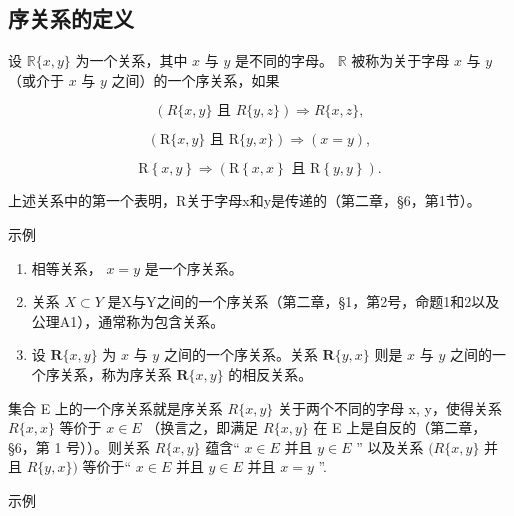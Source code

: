 \subsection{序关系的定义}

设 \(\mathbb{R}\{x, y\}\) 为一个关系，其中 \(x\) 与 \(y\) 是不同的字母。 \(\mathbb{R}\) 被称为关于字母 \(x\) 与 \(y\) （或介于 \(x\) 与 \(y\) 之间）的一个序关系，如果

\[
(R \{x, y \} \text {   且   } R \{y, z \}) \Longrightarrow R \{x, z \},
\]

\[
(\mathrm{R} \{x, y \} \text {   且   } \mathrm{R} \{y, x \}) \Longrightarrow (x = y),
\]

\[
\mathrm{R} \left\{x, y \right\} \Longrightarrow (\mathrm{R} \left\{x, x \right\} \text { 且 } \mathrm{R} \left\{y, y \right\}).
\]

上述关系中的第一个表明，R关于字母x和y是传递的（第二章，§6，第1节）。

示例

\begin{enumerate}
\def\labelenumi{(\arabic{enumi})}
\item
  相等关系， \(x = y\) 是一个序关系。
\item
  关系 \(X \subset Y\) 是X与Y之间的一个序关系（第二章，§1，第2号，命题1和2以及公理A1），通常称为包含关系。
\item
  设 \(\mathbf{R}\{x, y\}\) 为 \(x\) 与 \(y\) 之间的一个序关系。关系 \(\mathbf{R}\{y, x\}\) 则是 \(x\) 与 \(y\) 之间的一个序关系，称为序关系 \(\mathbf{R}\{x, y\}\) 的相反关系。
\end{enumerate}

集合 E 上的一个序关系就是序关系 \(R\{x, y\}\) 关于两个不同的字母 x, y，使得关系 \(R\{x, x\}\) 等价于 \(x \in E\) （换言之，即满足 \(R\{x, y\}\) 在 E 上是自反的（第二章，§6，第 1 号））。则关系 \(R\{x, y\}\) 蕴含“ \(x \in E\) 并且 \(y \in E\) '' 以及关系 \((R\{x, y\}\) 并且 \(R\{y, x\})\) 等价于“ \(x \in E\) 并且 \(y \in E\) 并且 \(x = y\) ''.

示例

